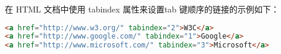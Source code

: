 在 HTML 文档中使用 tabindex 属性来设置tab 键顺序的链接的示例如下：

\begin{lstlisting}[language=HTML]
<a href="http://www.w3.org/" tabindex="2">W3C</a>
<a href="http://www.google.com/" tabindex="1">Google</a>
<a href="http://www.microsoft.com/" tabindex="3">Microsoft</a>
\end{lstlisting}


\clearpage





























































